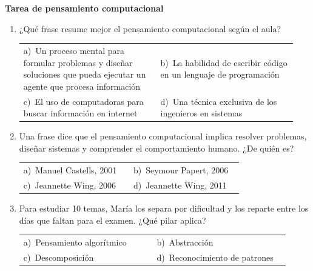 \documentclass[11pt,a4paper]{article}
\begin{document}
\raggedright
{\Large\bfseries Tarea de pensamiento computacional}
\vspace{10pt}
\begin{enumerate}[label=\textbf{\arabic*.},leftmargin=*,itemsep=6pt,topsep=0pt]
\item \begin{minipage}[t]{\linewidth}
¿Qué frase resume mejor el pensamiento computacional según el aula?

\vspace{4pt}
\begin{tabular}{@{}>{\raggedright\arraybackslash}p{0.47\linewidth}>{\raggedright\arraybackslash}p{0.47\linewidth}@{}}
a)~Un proceso mental para formular problemas y diseñar soluciones que pueda ejecutar un agente que procesa información & b)~La habilidad de escribir código en un lenguaje de programación \\
c)~El uso de computadoras para buscar información en internet & d)~Una técnica exclusiva de los ingenieros en sistemas \\
\end{tabular}
\end{minipage}

\item \begin{minipage}[t]{\linewidth}
Una frase dice que el pensamiento computacional implica resolver problemas, diseñar sistemas y comprender el comportamiento humano. ¿De quién es?

\vspace{4pt}
\begin{tabular}{@{}>{\raggedright\arraybackslash}p{0.47\linewidth}>{\raggedright\arraybackslash}p{0.47\linewidth}@{}}
a)~Manuel Castells, 2001 & b)~Seymour Papert, 2006 \\
c)~Jeannette Wing, 2006 & d)~Jeannette Wing, 2011 \\
\end{tabular}
\end{minipage}

\item \begin{minipage}[t]{\linewidth}
Para estudiar 10 temas, María los separa por dificultad y los reparte entre los días que faltan para el examen. ¿Qué pilar aplica?

\vspace{4pt}
\begin{tabular}{@{}>{\raggedright\arraybackslash}p{0.47\linewidth}>{\raggedright\arraybackslash}p{0.47\linewidth}@{}}
a)~Pensamiento algorítmico & b)~Abstracción \\
c)~Descomposición & d)~Reconocimiento de patrones \\
\end{tabular}
\end{minipage}


\end{enumerate}
\end{document}
